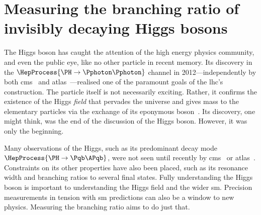 \fi




\section{Measuring the branching ratio of invisibly decaying Higgs bosons}
\label{sec:theory_higgs_to_inv}

The Higgs boson has caught the attention of the high energy physics community, and even the public eye, like no other particle in recent memory. Its discovery in the $\HepProcess{\PH \to \Pphoton\Pphoton}$ channel in 2012---independently by both \acrshort{cms}~\cite{Chatrchyan:2012xdj} and \acrshort{atlas}~\cite{Aad:2012tfa}---realised one of the paramount goals of the \acrshort{lhc}'s construction. The particle itself is not necessarily exciting. Rather, it confirms the existence of the Higgs \emph{field} that pervades the universe and gives mass to the elementary particles via the exchange of its eponymous boson~\cite{PhysRevLett.13.321,PhysRevLett.13.508,PhysRevLett.13.585}. Its discovery, one might think, was the end of the discussion of the Higgs boson. However, it was only the beginning.

Many observations of the Higgs, such as its predominant decay mode $\HepProcess{\PH \to \Pqb\APqb}$, were not seen until recently by \acrshort{cms}~\cite{Sirunyan:2018kst} or \acrshort{atlas}~\cite{Aaboud:2018zhk}. Constraints on its other properties have also been placed, such as its resonance width and branching ratios \BR to several final states. Fully understanding the Higgs boson is important to understanding the Higgs field and the wider \acrlong{sm}. Precision measurements in tension with \acrshort{sm} predictions can also be a window to new physics. Measuring the \higgstoinv branching ratio aims to do just that.

